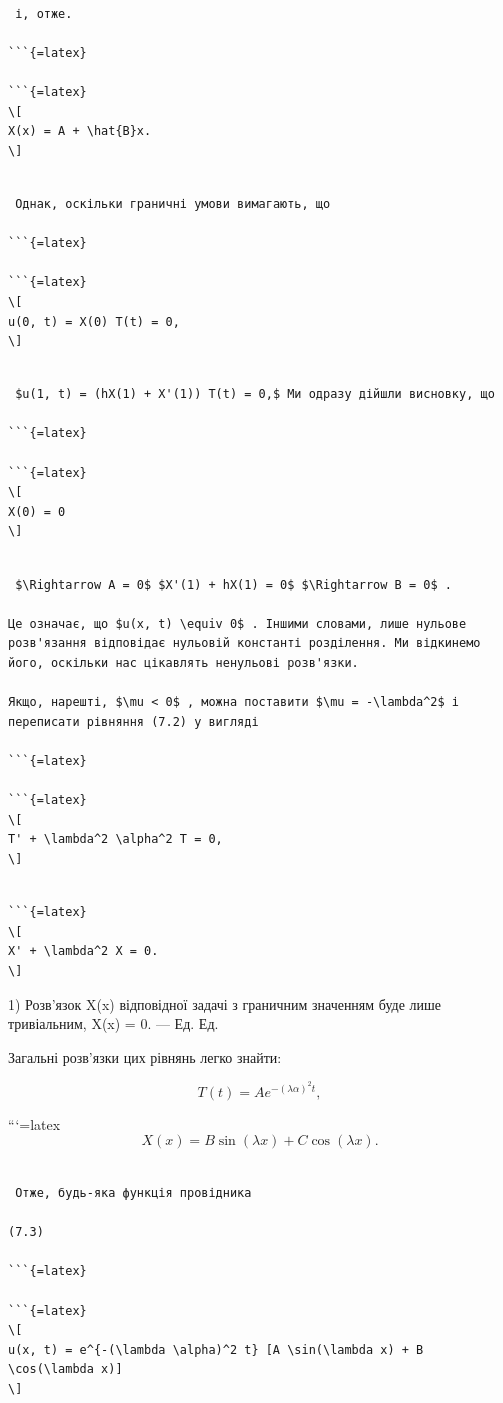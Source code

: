 \documentclass[
  ukrainian,
]{article}
\begin{document}
\begin{verbatim}

 і, отже.

```{=latex}

```{=latex}
\[
X(x) = A + \hat{B}x.
\]
\end{verbatim}

\begin{verbatim}

 Однак, оскільки граничні умови вимагають, що

```{=latex}

```{=latex}
\[
u(0, t) = X(0) T(t) = 0,
\]
\end{verbatim}

\begin{verbatim}

 $u(1, t) = (hX(1) + X'(1)) T(t) = 0,$ Ми одразу дійшли висновку, що

```{=latex}

```{=latex}
\[
X(0) = 0
\]
\end{verbatim}

\begin{verbatim}

 $\Rightarrow A = 0$ $X'(1) + hX(1) = 0$ $\Rightarrow B = 0$ .

Це означає, що $u(x, t) \equiv 0$ . Іншими словами, лише нульове розв'язання відповідає нульовій константі розділення. Ми відкинемо його, оскільки нас цікавлять ненульові розв'язки.

Якщо, нарешті, $\mu < 0$ , можна поставити $\mu = -\lambda^2$ і переписати рівняння (7.2) у вигляді

```{=latex}

```{=latex}
\[
T' + \lambda^2 \alpha^2 T = 0,
\]
\end{verbatim}

\begin{verbatim}

```{=latex}
\[
X' + \lambda^2 X = 0.
\]
\end{verbatim}

1) Розв'язок X(x) відповідної задачі з граничним значенням буде лише
тривіальним, X(x) = 0. --- Ед. Ед.

Загальні розв'язки цих рівнянь легко знайти:

\[
T(t) = Ae^{-(\lambda \alpha)^2 t},
\]

```{=latex}
\[
X(x) = B\sin(\lambda x) + C\cos(\lambda x).
\]

\begin{verbatim}

 Отже, будь-яка функція провідника

(7.3)

```{=latex}

```{=latex}
\[
u(x, t) = e^{-(\lambda \alpha)^2 t} [A \sin(\lambda x) + B \cos(\lambda x)]
\]
\end{verbatim}
\end{document}

